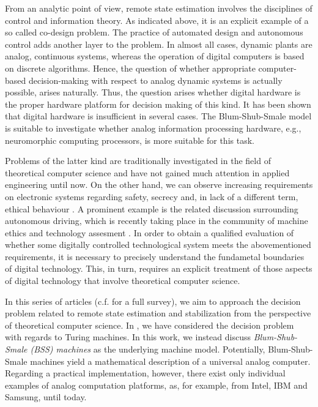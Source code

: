 \documentclass[conference]{IEEEtran}
\newcommand{\sdummy}{{\color{red}[SOURCE]}}
\newcommand{\tbr}[1]{}
\begin{document}
	From an analytic point of view, remote state estimation involves the disciplines of control and information theory. As indicated above, it is an explicit example of a so 
	called co-design problem. The practice of automated design and autonomous control adds another layer to the problem. In almost all cases, dynamic plants are analog, continuous  systems, 
	whereas the operation of digital computers is based on discrete algorithms. Hence, the question of whether appropriate computer-based decision-making with respect to analog 
	dynamic systems is actually possible, arises naturally. Thus, the question arises whether digital hardware is the proper hardware platform for decision making of this kind. It has been shown
	that digital hardware is insufficient in several cases. The Blum-Shub-Smale model is suitable to investigate whether analog information processing hardware, e.g., neuromorphic computing
	processors, is more suitable for this task.

	Problems of the latter kind are traditionally investigated in the field of theoretical computer science and have not gained much attention in applied engineering until now. 
	On the other hand, we can observe increasing requirements on electronic systems regarding safety, secrecy and, in lack of a different term, ethical behaviour \tbr{\sdummy}. 
	A prominent example is the related discussion surrounding autonomous driving, which is recently taking place in the community of machine ethics and technology assesment \tbr{\sdummy}. 
	In order to obtain a qualified evaluation of whether some digitally controlled technological system meets the abovementioned requirements, it is necessary to precisely understand 
	the fundametal boundaries of digital technology. This, in turn, requires an explicit treatment of those aspects of digital technology that involve theoretical computer science.

	In this series of articles (c.f. \cite{BoBoDe21X} for a full survey), we aim to approach the decision problem related to remote state estimation and stabilization from the perspective 
	of theoretical computer science. In \cite{BoBoDe21}\tbr{{\color{red}\(\leftarrow\) Change to TAC!~}}, we have considered the decision problem with regards to Turing machines. In this work, we instead discuss 
	\emph{Blum-Shub-Smale (BSS) machines} as the underlying machine model. Potentially, Blum-Shub-Smale machines yield a mathematical description of a universal analog computer.
	Regarding a practical implementation, however, there exist only individual examples of analog computation platforms, as, for example, from Intel, IBM and Samsung, until today. 
	
\end{document}
